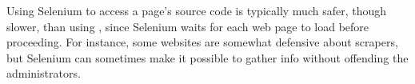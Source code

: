 \begin{comment} %
\begin{problem}
The arXiv (pronounced ``archive'') is an online repository of scientific publications, hosted by Cornell University.
Write a function that accepts a string to serve as a search query defaulting to \li{linkedin}.
Use Selenium to enter the query into the search bar of \url{https://arxiv.org} and press Enter.
The resulting page has up to 50 links to the PDFs of technical papers that match the query.
Gather these URLs, then continue to the next page (if there are more results) and continue gathering links until obtaining at most 150 URLs.
Return the list of URLs.
\end{problem}
\end{comment}
\begin{info}
Using Selenium to access a page's source code is typically much safer, though slower, than using , since Selenium waits for each web page to load before proceeding.
For instance, some websites are somewhat defensive about scrapers, but Selenium can sometimes make it possible to gather info without offending the administrators.
\end{info}

\begin{comment} %
\begin{problem}
The NBA has live statistics \url{http://stats.nba.com/}.
Use Selenium to return a list of the \li{a} tags containing each of the 30 NBA teams.
Use the \li{find_all()} method in conjunction with whatever unique identifiers get you the correct tags.
\\(Hint: class and tag name are a good start). %

\begin{itemize}
\item The column titles are Name, HW\%, AW\%, where Name is each team name, HW\% is the Home Win \%, and AW\% is the Away Win \%.
\item Each row represents a different basketball team, with its home and away win percentages.
\end{itemize}
Hint: You will need to use Selenium to access each teams website using the links from the tags found in problem \ref{prob:scraping-bball}.
If the websites do not load properly, consider a \li{try-except} clause like the one suggested previously.
\end{problem}
\end{comment}


